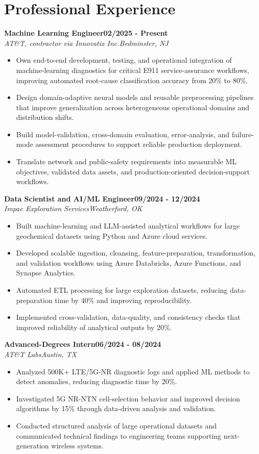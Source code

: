 \documentclass[9pt,letterpaper]{extarticle}
\newcommand{\role}[4]{%
  \Needspace{4\baselineskip}\textbf{#1}\hfill\textbf{#2}\\[-1pt]
  \textit{#3}\hfill\textit{#4}\par}
\begin{document}
\section{Professional Experience}
\role{Machine Learning Engineer}{02/2025 - Present}{AT\&T, contractor via Innovatix Inc.}{Bedminster, NJ}
\begin{itemize}
\item Own end-to-end development, testing, and operational integration of machine-learning diagnostics for critical E911 service-assurance workflows, improving automated root-cause classification accuracy from 20\% to 80\%.
\item Design domain-adaptive neural models and reusable preprocessing pipelines that improve generalization across heterogeneous operational domains and distribution shifts.
\item Build model-validation, cross-domain evaluation, error-analysis, and failure-mode assessment procedures to support reliable production deployment.
\item Translate network and public-safety requirements into measurable ML objectives, validated data assets, and production-oriented decision-support workflows.
\end{itemize}
\role{Data Scientist and AI/ML Engineer}{09/2024 - 12/2024}{Impac Exploration Services}{Weatherford, OK}
\begin{itemize}
\item Built machine-learning and LLM-assisted analytical workflows for large geochemical datasets using Python and Azure cloud services.
\item Developed scalable ingestion, cleansing, feature-preparation, transformation, and validation workflows using Azure Databricks, Azure Functions, and Synapse Analytics.
\item Automated ETL processing for large exploration datasets, reducing data-preparation time by 40\% and improving reproducibility.
\item Implemented cross-validation, data-quality, and consistency checks that improved reliability of analytical outputs by 20\%.
\end{itemize}
\role{Advanced-Degrees Intern}{06/2024 - 08/2024}{AT\&T Labs}{Austin, TX}
\begin{itemize}
\item Analyzed 500K+ LTE/5G-NR diagnostic logs and applied ML methods to detect anomalies, reducing diagnostic time by 20\%.
\item Investigated 5G NR-NTN cell-selection behavior and improved decision algorithms by 15\% through data-driven analysis and validation.
\item Conducted structured analysis of large operational datasets and communicated technical findings to engineering teams supporting next-generation wireless systems.
\end{itemize}
\end{document}
